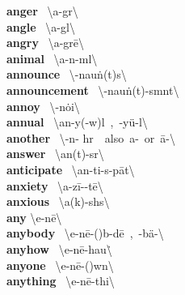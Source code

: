 \documentclass[10pt,a4paper]{article}
\begin{document}
\begin{multicols}{2}
\textbf{ anger }\quad \ \textbackslash \textprimstress a\engma -g\textschwa r\textbackslash \\
\textbf{ angle }\quad \ \textbackslash \textprimstress a\engma -g\textschwa l\textbackslash \\
\textbf{ angry }\quad \ \textbackslash \textprimstress a\engma -gr\={e}\textbackslash \\
\textbf{ animal }\quad \ \textbackslash \textprimstress a-n\textschwa -m\textschwa l\textbackslash \\
\textbf{ announce }\quad \ \textbackslash \textschwa -\textprimstress nau\. n(t)s\textbackslash \\
\textbf{ announcement }\quad \ \textbackslash \textschwa -\textprimstress nau\. n(t)-sm\textschwa nt\textbackslash \\
\textbf{ annoy }\quad \ \textbackslash \textschwa -\textprimstress n\.{o}i\textbackslash \\
\textbf{ annual }\quad \ \textbackslash \textprimstress an-y\textschwa (-w\textschwa )l\ ,\ -y\"{u}-\textschwa l\textbackslash \\
\textbf{ another }\quad \ \textbackslash \textschwa -\textprimstress n\textschwa - h\textschwa r\ \ also\ a-\ or\ \={a}-\textbackslash \\
\textbf{ answer }\quad \ \textbackslash \textprimstress an(t)-s\textschwa r\textbackslash \\
\textbf{ anticipate }\quad \ \textbackslash an-\textprimstress ti-s\textschwa -\textsecstress p\={a}t\textbackslash \\
\textbf{ anxiety }\quad \ \textbackslash a\engma -\textprimstress z\={i}-\textschwa -t\={e}\textbackslash \\
\textbf{ anxious }\quad \ \textbackslash \textprimstress a\engma (k)-sh\textschwa s\textbackslash \\
\textbf{ any }\quad \textbackslash \textprimstress e-n\={e}\textbackslash \\
\textbf{ anybody }\quad \ \textbackslash \textprimstress e-n\={e}-(\textsecstress )b\textschwa -d\={e}\ ,\ -\textsecstress b\"{a}-\textbackslash \\
\textbf{ anyhow }\quad \ \textbackslash \textprimstress e-n\={e}-\textsecstress hau\. \textbackslash \\
\textbf{ anyone }\quad \ \textbackslash \textprimstress e-n\={e}-(\textsecstress )w\textschwa n\textbackslash \\
\textbf{ anything }\quad \ \textbackslash \textprimstress e-n\={e}-\textsecstress thi\engma \textbackslash \\

\end{multicols}
\end{document}
